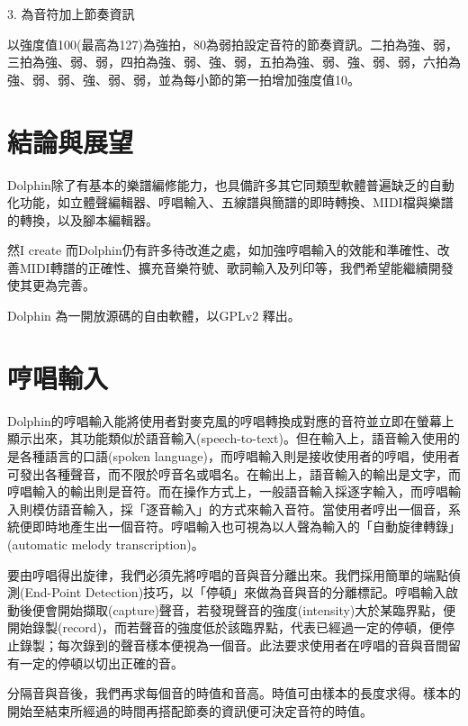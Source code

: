 \documentclass[12pt,a4paper,oneside]{report}
\begin{document}
3. 為音符加上節奏資訊

以強度值100(最高為127)為強拍，80為弱拍設定音符的節奏資訊。二拍為強、弱，三拍為強、弱、弱，四拍為強、弱、強、弱，五拍為強、弱、強、弱、弱，六拍為強、弱、弱、強、弱、弱，並為每小節的第一拍增加強度值10。



\chapter{結論與展望}

Dolphin除了有基本的樂譜編修能力，也具備許多其它同類型軟體普遍缺乏的自動化功能，如立體聲編輯器、哼唱輸入、五線譜與簡譜的即時轉換、MIDI檔與樂譜的轉換，以及腳本編輯器。

然I create 而Dolphin仍有許多待改進之處，如加強哼唱輸入的效能和準確性、改善MIDI轉譜的正確性、擴充音樂符號、歌詞輸入及列印等，我們希望能繼續開發使其更為完善。

Dolphin 為一開放源碼的自由軟體，以GPLv2 釋出。


\appendix



\chapter{哼唱輸入} %

Dolphin的哼唱輸入能將使用者對麥克風的哼唱轉換成對應的音符並立即在螢幕上顯示出來，其功能類似於語音輸入(speech-to-text)。但在輸入上，語音輸入使用的是各種語言的口語(spoken language)，而哼唱輸入則是接收使用者的哼唱，使用者可發出各種聲音，而不限於哼音名或唱名。在輸出上，語音輸入的輸出是文字，而哼唱輸入的輸出則是音符。而在操作方式上，一般語音輸入採逐字輸入，而哼唱輸入則模仿語音輸入，採「逐音輸入」的方式來輸入音符。當使用者哼出一個音，系統便即時地產生出一個音符。哼唱輸入也可視為以人聲為輸入的「自動旋律轉錄」(automatic melody transcription)。

要由哼唱得出旋律，我們必須先將哼唱的音與音分離出來。我們採用簡單的端點偵測(End-Point Detection)\cite{endPointDetection}技巧，以「停頓」來做為音與音的分離標記。哼唱輸入啟動後便會開始擷取(capture)聲音，若發現聲音的強度(intensity)大於某臨界點，便開始錄製(record)，而若聲音的強度低於該臨界點，代表已經過一定的停頓，便停止錄製；每次錄到的聲音樣本便視為一個音。此法要求使用者在哼唱的音與音間留有一定的停頓以切出正確的音。

分隔音與音後，我們再求每個音的時值和音高。時值可由樣本的長度求得。樣本的開始至結束所經過的時間再搭配節奏的資訊便可決定音符的時值。
\end{document}
